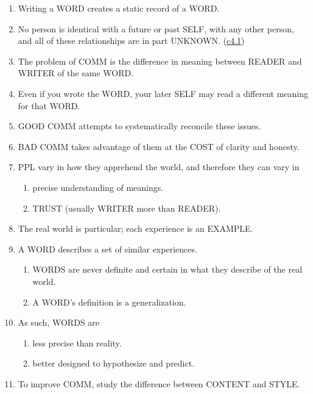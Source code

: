 \documentclass[
]{book}
\providecommand{\tightlist}{%
  \setlength{\itemsep}{0pt}\setlength{\parskip}{0pt}}
\begin{document}
\begin{enumerate}
\def\labelenumi{\arabic{enumi}.}
\setcounter{enumi}{16}
\tightlist
\item
  Writing a WORD creates a static record of a WORD.
\item
  No person is identical with a future or past SELF, with any other
  person, and all of these relationships are in part UNKNOWN.
  (\protect\hyperlink{ppl}{c4.1})
\item
  The problem of COMM is the difference in meaning between READER and
  WRITER of the same WORD.
\item
  Even if you wrote the WORD, your later SELF may read a different
  meaning for that WORD.
\item
  GOOD COMM attempts to systematically reconcile these issues.
\item
  BAD COMM takes advantage of them at the COST of clarity and honesty.
\item
  PPL vary in how they apprehend the world, and therefore they can
  vary in

  \begin{enumerate}
  \def\labelenumii{\arabic{enumii}.}
  \tightlist
  \item
    precise understanding of meanings.
  \item
    TRUST (usually WRITER more than READER).
  \end{enumerate}
\item
  The real world is particular; each experience is an EXAMPLE.
\item
  A WORD describes a set of similar experiences.

  \begin{enumerate}
  \def\labelenumii{\arabic{enumii}.}
  \tightlist
  \item
    WORDS are never definite and certain in what they describe of
    the real world.
  \item
    A WORD's definition is a generalization.
  \end{enumerate}
\item
  As such, WORDS are

  \begin{enumerate}
  \def\labelenumii{\arabic{enumii}.}
  \tightlist
  \item
    less precise than reality.
  \item
    better designed to hypothesize and predict.
  \end{enumerate}
\item
  To improve COMM, study the difference between CONTENT and STYLE.
\end{enumerate}
\end{document}
